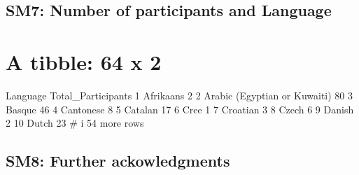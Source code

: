 \documentclass[
]{article}
\begin{document}
\hypertarget{sm7-number-of-participants-and-language}{%
\subsection{SM7: Number of participants and
Language}\label{sm7-number-of-participants-and-language}}

\hypertarget{a-tibble-64-x-2}{%
\section{A tibble: 64 x 2}\label{a-tibble-64-x-2}}

Language Total\_Participants 1 Afrikaans 2 2 Arabic (Egyptian or
Kuwaiti) 80 3 Basque 46 4 Cantonese 8 5 Catalan 17 6 Cree 1 7 Croatian 3
8 Czech 6 9 Danish 2 10 Dutch 23 \# i 54 more rows

\hypertarget{sm8-further-ackowledgments}{%
\subsection{SM8: Further
ackowledgments}\label{sm8-further-ackowledgments}}
\end{document}
